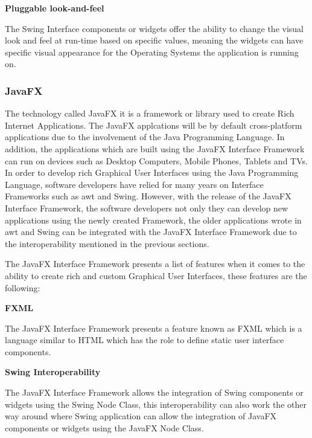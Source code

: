 \noindent
\textbf{Pluggable look-and-feel}
\newline

The Swing Interface components or widgets offer the ability to change the visual look and
feel at run-time based on specific values, meaning the widgets can have specific visual
appearance for the Operating Systems the application is running on.

\subsubsection{JavaFX}

The technology called JavaFX it is a framework or library used to create Rich Internet
Applications. The JavaFX applcations will be by default cross-platform applications due to
the involvement of the Java Programming Language. In addition, the applications which are
built using the JavaFX Interface Framework can run on devices such as Desktop Computers,
Mobile Phones, Tablets and TVs. In order to develop rich Graphical User Interfaces using
the Java Programming Language, software developers have relied for many years on Interface
Frameworks such as \acrfull{awt} and Swing. However, with the release of the JavaFX
Interface Framework, the software developers not only they can develop new applications
using the newly created Framework, the older applications wrote in \acrfull{awt} and Swing
can be integrated with the JavaFX Interface Framework due to the interoperability mentioned
in the previous sections.

\newpage

The JavaFX Interface Framework presents a list of features when it comes
to the ability to create rich and custom Graphical User Interfaces, these
features are the following: \newline

\noindent
\textbf{FXML}
\newline

The JavaFX Interface Framework presents a feature known as FXML which is a language
similar to HTML which has the role to define static user interface components. \newline

\noindent
\textbf{Swing Interoperability}
\newline

The JavaFX Interface Framework allows the integration of Swing components or widgets using
the Swing Node Class, this interoperability can also work the other way around where Swing
application can allow the integration of JavaFX components or widgets using the JavaFX
Node Class. \newline

